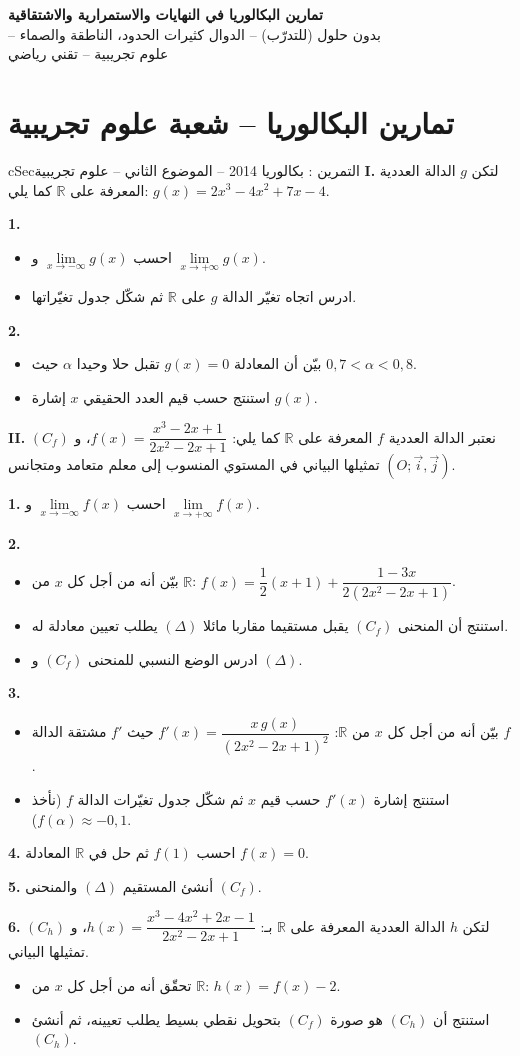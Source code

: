 \documentclass[12pt,a4paper]{article}
\newenvironment{BOX}[2]{\begin{otherlanguage}{english}\begin{arbox}{#1}{#2}}{\end{arbox}\end{otherlanguage}}
\newcounter{exo}
\newenvironment{tamrin}[1]{\stepcounter{exo}\begin{BOX}{cSec}{التمرين \theexo: #1}}{\end{BOX}}
\newenvironment{LTR}{\begin{otherlanguage}{english}}{\end{otherlanguage}}
\newcommand{\R}{\mathbb{R}}
\newenvironment{sq}{\begin{itemize}[leftmargin=2.4em,itemsep=3pt]}{\end{itemize}}
\newcommand{\qa}{\item[(أ)]}\newcommand{\qb}{\item[(ب)]}\newcommand{\qc}{\item[(جـ)]}\newcommand{\qd}{\item[(د)]}\newcommand{\qe}{\item[(هـ)]}
\newcommand{\QQ}[1]{\par\smallskip\textbf{#1.} }
\begin{document}
\begin{LTR}
\begin{tcolorbox}[enhanced,colback=cSec,colframe=cSec,arc=3mm,halign=center,boxrule=0pt,top=12pt,bottom=12pt,before upper={\selectlanguage{arabic}}]
{\color{white}\fontsize{21}{27}\selectfont\bfseries تمارين البكالوريا في النهايات والاستمرارية والاشتقاقية}\\[8pt]
{\color{white}\large -- بدون حلول (للتدرّب) -- الدوال كثيرات الحدود، الناطقة والصماء}\\[5pt]
{\color{white}\large علوم تجريبية -- تقني رياضي}
\end{tcolorbox}
\end{LTR}

\section{تمارين البكالوريا -- شعبة علوم تجريبية}
\begin{tamrin}{بكالوريا 2014 -- الموضوع الثاني -- علوم تجريبية}
\textbf{I.} لتكن $g$ الدالة العددية المعرفة على $\R$ كما يلي: $g(x)=2x^{3}-4x^{2}+7x-4$.
\QQ{1}
\begin{sq}
\qa احسب $\lim\limits_{x\to-\infty}g(x)$ و $\lim\limits_{x\to+\infty}g(x)$.
\qb ادرس اتجاه تغيّر الدالة $g$ على $\R$ ثم شكّل جدول تغيّراتها.
\end{sq}
\QQ{2}
\begin{sq}
\qa بيّن أن المعادلة $g(x)=0$ تقبل حلا وحيدا $\alpha$ حيث $0{,}7<\alpha<0{,}8$.
\qb استنتج حسب قيم العدد الحقيقي $x$ إشارة $g(x)$.
\end{sq}
\textbf{II.} نعتبر الدالة العددية $f$ المعرفة على $\R$ كما يلي: $f(x)=\dfrac{x^{3}-2x+1}{2x^{2}-2x+1}$، و $(C_f)$ تمثيلها البياني في المستوي المنسوب إلى معلم متعامد ومتجانس $(O;\vec i,\vec j)$.
\QQ{1} احسب $\lim\limits_{x\to-\infty}f(x)$ و $\lim\limits_{x\to+\infty}f(x)$.
\QQ{2}
\begin{sq}
\qa بيّن أنه من أجل كل $x$ من $\R$: $f(x)=\dfrac12(x+1)+\dfrac{1-3x}{2(2x^{2}-2x+1)}$.
\qb استنتج أن المنحنى $(C_f)$ يقبل مستقيما مقاربا مائلا $(\Delta)$ يطلب تعيين معادلة له.
\qc ادرس الوضع النسبي للمنحنى $(C_f)$ و $(\Delta)$.
\end{sq}
\QQ{3}
\begin{sq}
\qa بيّن أنه من أجل كل $x$ من $\R$: $f'(x)=\dfrac{x\,g(x)}{(2x^{2}-2x+1)^{2}}$ حيث $f'$ مشتقة الدالة $f$.
\qb استنتج إشارة $f'(x)$ حسب قيم $x$ ثم شكّل جدول تغيّرات الدالة $f$ (نأخذ $f(\alpha)\approx-0{,}1$).
\end{sq}
\QQ{4} احسب $f(1)$ ثم حل في $\R$ المعادلة $f(x)=0$.
\QQ{5} أنشئ المستقيم $(\Delta)$ والمنحنى $(C_f)$.
\QQ{6} لتكن $h$ الدالة العددية المعرفة على $\R$ بـ: $h(x)=\dfrac{x^{3}-4x^{2}+2x-1}{2x^{2}-2x+1}$، و $(C_h)$ تمثيلها البياني.
\begin{sq}
\qa تحقّق أنه من أجل كل $x$ من $\R$: $h(x)=f(x)-2$.
\qb استنتج أن $(C_h)$ هو صورة $(C_f)$ بتحويل نقطي بسيط يطلب تعيينه، ثم أنشئ $(C_h)$.
\end{sq}
\end{tamrin}
\end{document}
